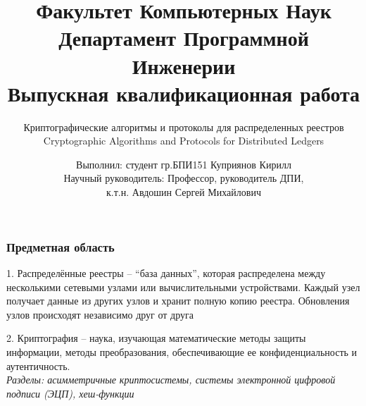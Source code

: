 \documentclass{beamer}
\title[Заголовок]{\footnotesize Факультет Компьютерных Наук\\Департамент
Программной Инженерии\\Выпускная квалификационная работа}
\subtitle{Криптографические алгоритмы и протоколы для распределенных реестров\\
Cryptographic Algorithms and Protocols for Distributed Ledgers}
\author[Куприянов К.И.]{\scriptsize Выполнил: студент
гр.БПИ151 Куприянов Кирилл\\Научный руководитель: Профессор, руководитель ДПИ,\\к.т.н. Авдошин Сергей Михайлович}
\institute[Высшая школа экономики]{}
\date{\the\year}
\begin{document}
\frame[plain]{
    \maketitle
}



\begin{frame}
\frametitle{Предметная область}
    \begin{multicols}{2}
        1. Распределённые реестры -- ``база данных'', которая распределена между
        несколькими сетевыми узлами или вычислительными устройствами. Каждый
        узел получает данные из других узлов и хранит полную копию реестра.
        Обновления узлов происходят независимо друг от друга

        \columnbreak

        2. Криптография -- наука, изучающая математические методы защиты
        информации, методы преобразования, обеспечивающие ее конфиденциальность
        и аутентичность.\\
        \emph{Разделы: асимметричные криптосистемы, системы электронной цифровой
        подписи (ЭЦП), хеш-функции}
        \medskip
    \end{multicols}
\end{frame}
\end{document}
